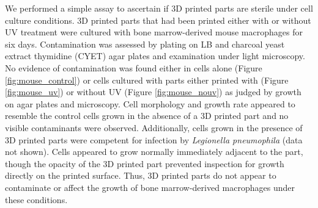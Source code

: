 \documentclass[fleqn,10pt]{wlpeerj}
\begin{document}
We performed a simple assay to ascertain if 3D printed parts are sterile under
cell culture conditions. 3D printed parts that had been printed either with or
without UV treatment were cultured with bone marrow-derived mouse macrophages
for six days. Contamination was assessed by plating on LB and charcoal yeast
extract thymidine (CYET) agar plates and examination under light microscopy.
No evidence of contamination was found either in cells alone (Figure
\ref{fig:mouse_control}) or cells cultured with parts either printed with
(Figure \ref{fig:mouse_uv}) or without  UV (Figure \ref{fig:mouse_nouv}) as
judged by growth on agar plates and microscopy. Cell morphology and growth
rate appeared to resemble the control cells grown in the absence of a 3D
printed part and no visible contaminants were observed. Additionally, cells
grown in the presence of 3D printed parts were competent for infection by {\em
Legionella pneumophila} (data not shown). Cells appeared to grow normally
immediately adjacent to the part, though the opacity of the 3D printed part
prevented inspection for growth directly on the printed surface. Thus, 3D
printed parts do not appear to contaminate or affect the growth of bone
marrow-derived macrophages under these conditions.
\end{document}
